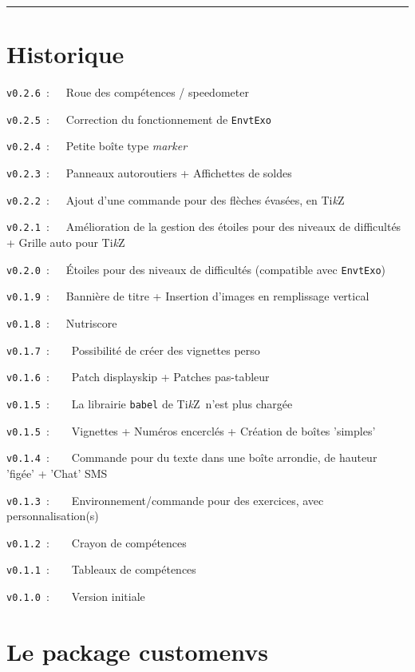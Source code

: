 \documentclass[french,11pt,a4paper]{article}
\providecommand\tikzlogo{Ti\textit{k}Z}
\let\TikZ\tikzlogo
\begin{document}
\tableofcontents

\vspace*{5mm}

\hrule

\pagebreak

\section{Historique}

\verb|v0.2.6|~:~~~Roue des compétences / speedometer

\verb|v0.2.5|~:~~~Correction du fonctionnement de \texttt{EnvtExo}

\verb|v0.2.4|~:~~~Petite boîte type \textit{marker}

\verb|v0.2.3|~:~~~Panneaux autoroutiers + Affichettes de soldes

\verb|v0.2.2|~:~~~Ajout d'une commande pour des flèches évasées, en \TikZ\

\verb|v0.2.1|~:~~~Amélioration de la gestion des étoiles pour des niveaux de difficultés + Grille auto pour \TikZ\

\verb|v0.2.0|~:~~~Étoiles pour des niveaux de difficultés (compatible avec \texttt{EnvtExo})

\verb|v0.1.9|~:~~~Bannière de titre + Insertion d'images en remplissage vertical

\verb|v0.1.8|~:~~~Nutriscore

\verb|v0.1.7|~:~~~~Possibilité de créer des vignettes \textsf{perso}

\verb|v0.1.6|~:~~~~Patch \textsf{displayskip} + Patches \textsf{pas-tableur}

\verb|v0.1.5|~:~~~~La librairie \texttt{babel} de \TikZ\ n'est plus chargée

\verb|v0.1.5|~:~~~~Vignettes + Numéros encerclés + Création de boîtes 'simples'

\verb|v0.1.4|~:~~~~Commande pour du texte dans une boîte arrondie, de hauteur 'figée' + 'Chat' SMS

\verb|v0.1.3|~:~~~~Environnement/commande pour des exercices, avec personnalisation(s)

\verb|v0.1.2|~:~~~~Crayon de compétences

\verb|v0.1.1|~:~~~~Tableaux de compétences

\verb|v0.1.0|~:~~~~Version initiale

\pagebreak

\section{Le package customenvs}
\end{document}

